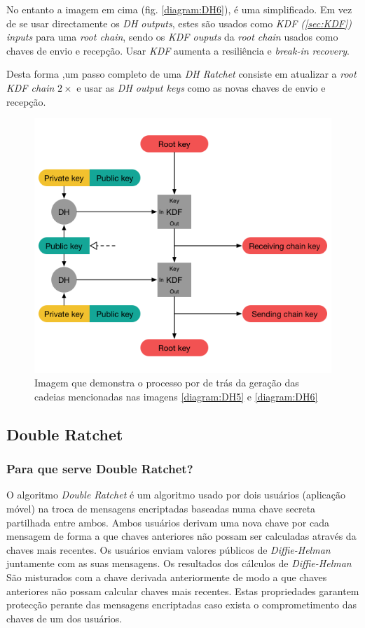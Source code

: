 No entanto a imagem em cima (fig. \ref{diagram:DH6}), é uma simplificado. Em vez de se usar directamente os \textit{DH outputs}, estes são usados como \textit{KDF (\ref{sec:KDF}) inputs} para uma \textit{root chain}, sendo os \textit{KDF ouputs} da \textit{root chain} usados como chaves de envio e recepção. Usar \textit{KDF} aumenta a resiliência e \textit{break-in recovery}.

Desta forma ,um passo completo de uma \textit{DH Ratchet} consiste em atualizar a \textit{root KDF chain} $2\times$ e usar as \textit{DH output keys} como as novas chaves de envio e recepção.

\begin{figure}[H]
\begin{center}
\includegraphics[width=12cm]{img/DH7.png}
\caption{Imagem que demonstra o processo por de trás da geração das cadeias mencionadas nas imagens \ref{diagram:DH5} e \ref{diagram:DH6}}
\label{diagram:DH7}
\centering
\end{center}
\end{figure}

\subsection{Double Ratchet}\label{sec:DoubleRatchet}
\subsubsection{Para que serve Double Ratchet?}
O algoritmo \emph{Double Ratchet} é um algoritmo usado por dois usuários (aplicação móvel) na troca de mensagens encriptadas baseadas numa chave secreta partilhada entre ambos. Ambos usuários derivam uma nova chave por cada mensagem de forma a que chaves anteriores não possam ser calculadas através da chaves mais recentes. Os usuários enviam valores públicos de \emph{Diffie-Helman} juntamente com as suas mensagens. Os resultados dos cálculos de \emph{Diffie-Helman} São misturados com a chave derivada anteriormente de modo a que chaves anteriores não possam calcular chaves mais recentes. Estas propriedades garantem protecção perante das mensagens encriptadas caso exista o comprometimento das chaves de um dos usuários.

